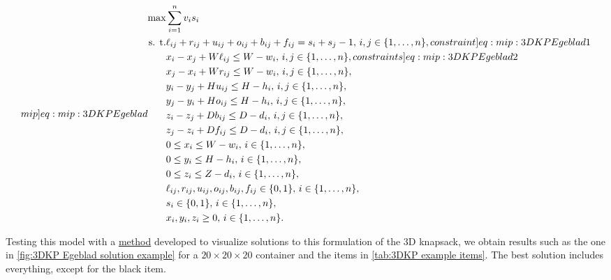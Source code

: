 \begin{subequations}
    \label[mip]{eq:mip:3DKP Egeblad}
    \begin{align}
        \max &\sum_{i=1}^{n}v_i s_i\\
        \text{s. t.} & \ell_{ij} + r_{ij} + u_{ij} + o_{ij} + b_{ij} + f_{ij} = s_i + s_j - 1, \, i, j \in \{1,\dots,n\}, \label[constraint]{eq:mip:3DKP Egeblad 1}\\
        & x_i - x_j + W\ell_{ij} \leq W - w_i, \, i, j \in \{1,\dots,n\}, \label[constraints]{eq:mip:3DKP Egeblad 2}\\
        & x_j - x_i + Wr_{ij} \leq W - w_i, \, i, j \in \{1,\dots,n\},\\
        & y_i - y_j + Hu_{ij} \leq H - h_i, \, i, j \in \{1,\dots,n\},\\
        & y_j - y_i + Ho_{ij} \leq H - h_i, \, i, j \in \{1,\dots,n\},\\
        & z_i - z_j + Db_{ij} \leq D - d_i, \, i, j \in \{1,\dots,n\},\\
        & z_j - z_i + Df_{ij} \leq D - d_i, \, i, j \in \{1,\dots,n\},\\
        & 0 \leq x_i \leq W - w_i, \, i \in \{1,\dots,n\},\\
        & 0 \leq y_i \leq H - h_i, \, i \in \{1,\dots,n\},\\
        & 0 \leq z_i \leq Z - d_i, \, i \in \{1,\dots,n\},\\
        & \ell_{ij}, r_{ij}, u_{ij}, o_{ij}, b_{ij}, f_{ij} \in \{0,1\}, \, i \in \{1,\dots,n\},\\
        & s_i \in \{0,1\}, \, i \in \{1,\dots,n\},\\
        & x_i, y_i, z_i \geq 0, \, i \in \{1,\dots,n\}.
    \end{align}
\end{subequations}

Testing this model with a \href{function draw_3d_knapsack_solution(kv::KnapsackVectors)}{method} developed to visualize solutions to this formulation of the 3D knapsack, we obtain results such as the one in \cref{fig:3DKP Egeblad solution example} for a $20\times20\times20$ container and the items in \cref{tab:3DKP example items}. The best solution includes everything, except for the black item.

